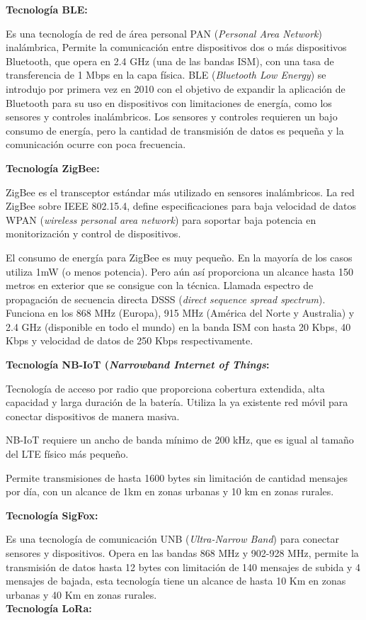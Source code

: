 \textbf{Tecnología BLE:}

Es una tecnología de red de área personal PAN (\textit{Personal Area Network}) inalámbrica, Permite la comunicación entre dispositivos dos o  más dispositivos Bluetooth, que opera en 2.4 GHz (una de las bandas ISM), con una tasa de transferencia de 1 Mbps en la capa física. BLE (\textit{Bluetooth Low Energy}) se introdujo por primera vez en 2010 con el objetivo de expandir la aplicación de Bluetooth para su uso en dispositivos con limitaciones de energía, como los sensores y controles inalámbricos. Los sensores y controles requieren un bajo consumo de energía, pero la cantidad de transmisión de datos es pequeña y la comunicación ocurre con poca frecuencia\citep{chang2014bluetooth}.


\textbf{Tecnología ZigBee:}

ZigBee es el transceptor estándar más utilizado en sensores inalámbricos. La red ZigBee sobre IEEE 802.15.4, define especificaciones para baja velocidad de datos WPAN (\textit{wireless personal area network}) para soportar baja potencia en monitorización y control de dispositivos\citep{ramya2011study}.

El consumo de energía para ZigBee es muy pequeño. En la mayoría de los casos utiliza 1mW (o menos potencia). Pero aún así proporciona un alcance hasta 150 metros en exterior que se consigue con la técnica. Llamada espectro de propagación de secuencia directa DSSS (\textit{direct sequence spread spectrum}). Funciona en los 868 MHz (Europa), 915 MHz (América del Norte y Australia) y 2.4 GHz (disponible en todo el mundo) en la banda ISM con hasta 20 Kbps, 40 Kbps y velocidad de datos de 250 Kbps respectivamente\citep{ramya2011study}.

\textbf{Tecnología NB-IoT (\textit{Narrowband Internet of Things}:}

Tecnología de acceso por radio que proporciona cobertura extendida, alta capacidad y larga duración de la batería. Utiliza la ya existente red móvil para conectar dispositivos de manera masiva.

NB-IoT requiere un ancho de banda mínimo de 200 kHz, que es igual al tamaño del LTE físico más pequeño\citep{adhikary2016performance}.

Permite transmisiones de hasta 1600 bytes sin limitación de cantidad mensajes por día, con un alcance de 1km en zonas urbanas y 10 km en zonas rurales\citep{MEKKI20191}.

\textbf{Tecnología SigFox:} 

Es una tecnología de comunicación UNB (\textit{Ultra-Narrow Band}) para conectar sensores y dispositivos. Opera en las bandas 868 MHz y 902-928 MHz, permite la transmisión de datos hasta 12 bytes con limitación de 140 mensajes de subida y 4 mensajes de bajada, esta tecnología tiene un alcance de hasta 10 Km en zonas urbanas y 40 Km en zonas rurales\citep{MEKKI20191}.
\\
\newline
\newline
\hfill \break
\textbf{Tecnología LoRa:} 

